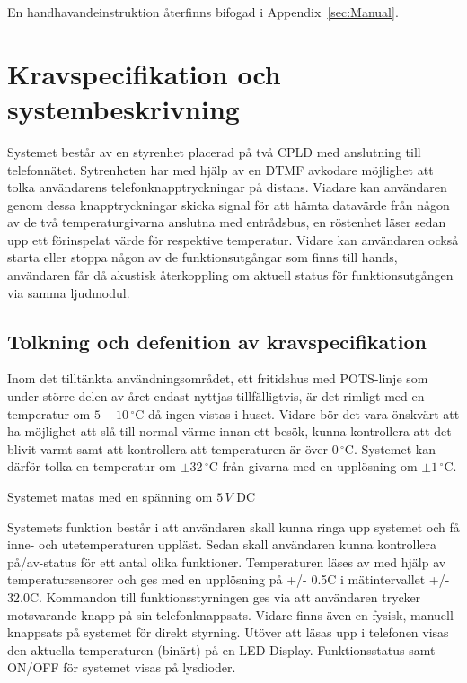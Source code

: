 \documentclass[a4paper,11pt]{article}
\begin{document}
	En handhavandeinstruktion återfinns bifogad i Appendix~\ref{sec:Manual}.

\pagebreak

\section{Kravspecifikation och systembeskrivning}
	Systemet består av en styrenhet placerad på två CPLD med anslutning till telefonnätet. Sytrenheten har med hjälp av en DTMF avkodare möjlighet att tolka användarens telefonknapptryckningar på distans. Viadare kan användaren genom dessa knapptryckningar skicka signal för att hämta datavärde från någon av de två temperaturgivarna anslutna med entrådsbus, en röstenhet läser sedan upp ett förinspelat värde för respektive temperatur. Vidare kan användaren också starta eller stoppa någon av de funktionsutgångar som finns till hands, användaren får då akustisk återkoppling om aktuell status för funktionsutgången via samma ljudmodul. 

	\subsection{Tolkning och defenition av kravspecifikation}

	Inom det tilltänkta användningsområdet, ett fritidshus med POTS-linje som under större delen av året endast nyttjas tillfälligtvis, är det rimligt med en temperatur om $5-10\,^{\circ}\mathrm{C}$ då ingen vistas i huset. Vidare bör det vara önskvärt att ha möjlighet att slå till normal värme innan ett besök, kunna kontrollera att det blivit varmt samt att kontrollera att temperaturen är över $0\,^{\circ}\mathrm{C}$. Systemet kan därför tolka en temperatur om $\pm 32\,^{\circ}\mathrm{C}$ från givarna med en upplösning om $\pm 1\,^{\circ}\mathrm{C}$.

Systemet matas med en spänning om $5\,V$ DC

	Systemets funktion består i att användaren skall kunna ringa upp systemet och få inne- och utetemperaturen
	uppläst. Sedan skall användaren kunna kontrollera på/av-status för ett antal olika funktioner. Temperaturen
	läses av med hjälp av temperatursensorer och ges med en upplösning på +/- 0.5C i mätintervallet +/- 32.0C.
	Kommandon till funktionsstyrningen ges via att användaren trycker motsvarande knapp på sin telefonknappsats.
	Vidare finns även en fysisk, manuell knappsats på systemet för direkt styrning. Utöver att läsas upp i 
	telefonen visas den aktuella temperaturen (binärt) på en LED-Display. Funktionsstatus samt ON/OFF för systemet
	visas på lysdioder.
\end{document}
